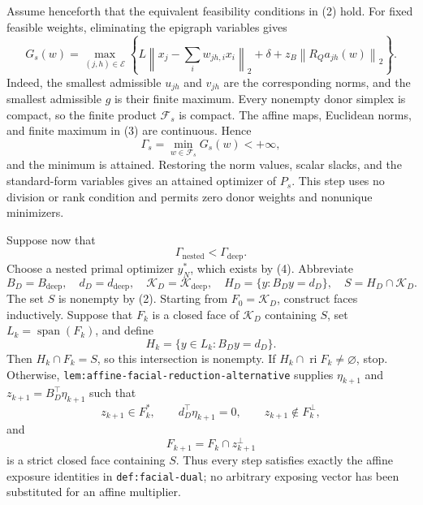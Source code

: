 Assume henceforth that the equivalent feasibility conditions in (2) hold.  For fixed feasible weights, eliminating the epigraph variables gives
\[
 G_s(w)=\max_{(j,h)\in\mathcal E}
 \left\{
 L\left\|x_j-\sum_iw_{jh,i}x_i\right\|_2+
 \delta+z_B\left\|R_Qa_{jh}(w)\right\|_2
 \right\}.                                                             \tag{3}
\]
Indeed, the smallest admissible \(u_{jh}\) and \(v_{jh}\) are the corresponding norms, and the smallest admissible \(g\) is their finite maximum.  Every nonempty donor simplex is compact, so the finite product \(\mathcal F_s\) is compact.  The affine maps, Euclidean norms, and finite maximum in (3) are continuous.  Hence
\[
 \Gamma_s=\min_{w\in\mathcal F_s}G_s(w)<+\infty,                       \tag{4}
\]
and the minimum is attained.  Restoring the norm values, scalar slacks, and the standard-form variables gives an attained optimizer of \(P_s\).  This step uses no division or rank condition and permits zero donor weights and nonunique minimizers.

Suppose now that
\[
 \Gamma_{\mathrm{nested}}<\Gamma_{\mathrm{deep}}.                     \tag{5}
\]
Choose a nested primal optimizer \(y_N^*\), which exists by (4).  Abbreviate
\[
 B_D=B_{\mathrm{deep}},\quad d_D=d_{\mathrm{deep}},\quad
 \mathcal K_D=\mathcal K_{\mathrm{deep}},\quad
 H_D=\{y:B_Dy=d_D\},\quad S=H_D\cap\mathcal K_D.
\]
The set \(S\) is nonempty by (2).  Starting from \(F_0=\mathcal K_D\), construct faces inductively.  Suppose that \(F_k\) is a closed face of \(\mathcal K_D\) containing \(S\), set \(L_k=\operatorname{span}(F_k)\), and define
\[
 H_k=\{y\in L_k:B_Dy=d_D\}.                                            \tag{6}
\]
Then \(H_k\cap F_k=S\), so this intersection is nonempty.  If \(H_k\cap\operatorname{ri}F_k\ne\varnothing\), stop.  Otherwise, \texttt{lem:affine-facial-reduction-alternative} supplies \(\eta_{k+1}\) and \(z_{k+1}=B_D^{\top}\eta_{k+1}\) such that
\[
 z_{k+1}\in F_k^*,\qquad
 d_D^{\top}\eta_{k+1}=0,\qquad
 z_{k+1}\notin F_k^\perp,                                              \tag{7}
\]
and
\[
 F_{k+1}=F_k\cap z_{k+1}^\perp                                         \tag{8}
\]
is a strict closed face containing \(S\).  Thus every step satisfies exactly the affine exposure identities in \texttt{def:facial-dual}; no arbitrary exposing vector has been substituted for an affine multiplier.

